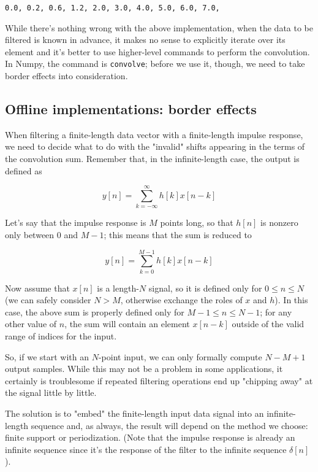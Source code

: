 \documentclass[11pt]{article}
\begin{document}
    \begin{Verbatim}[commandchars=\\\{\}]
0.0, 0.2, 0.6, 1.2, 2.0, 3.0, 4.0, 5.0, 6.0, 7.0, 
    \end{Verbatim}

    While there's nothing wrong with the above implementation, when the data
to be filtered is known in advance, it makes no sense to explicitly
iterate over its element and it's better to use higher-level commands to
perform the convolution. In Numpy, the command is \texttt{convolve};
before we use it, though, we need to take border effects into
consideration.

    \subsection{Offline implementations: border
effects}\label{offline-implementations-border-effects}

When filtering a finite-length data vector with a finite-length impulse
response, we need to decide what to do with the "invalid" shifts
appearing in the terms of the convolution sum. Remember that, in the
infinite-length case, the output is defined as

\[
    y[n] = \sum_{k=-\infty}^{\infty} h[k]x[n-k]
\]

Let's say that the impulse response is \(M\) points long, so that
\(h[n]\) is nonzero only between \(0\) and \(M-1\); this means that the
sum is reduced to

\[
    y[n] = \sum_{k=0}^{M-1} h[k]x[n-k]
\]

Now assume that \(x[n]\) is a length-\(N\) signal, so it is defined only
for \(0 \leq n \le N\) (we can safely consider \(N > M\), otherwise
exchange the roles of \(x\) and \(h\)). In this case, the above sum is
properly defined only for \(M - 1 \le n \le N-1\); for any other value
of \(n\), the sum will contain an element \(x[n-k]\) outside of the
valid range of indices for the input.

So, if we start with an \(N\)-point input, we can only formally compute
\(N-M+1\) output samples. While this may not be a problem in some
applications, it certainly is troublesome if repeated filtering
operations end up "chipping away" at the signal little by little.

The solution is to "embed" the finite-length input data signal into an
infinite-length sequence and, as always, the result will depend on the
method we choose: finite support or periodization. (Note that the
impulse response is already an infinite sequence since it's the response
of the filter to the infinite sequence \(\delta[n]\)).
\end{document}
